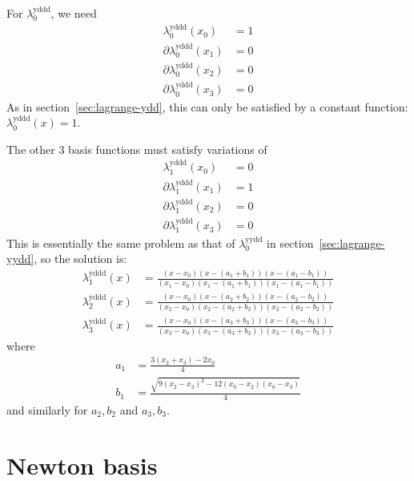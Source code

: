 For $\lambda^{\text{yddd}}_0$, we need 
\begin{align}
\lambda^{\text{yddd}}_0(x_0) & = 1 \\ 
\partial\lambda^{\text{yddd}}_0(x_1) & = 0 \nonumber \\
\partial\lambda^{\text{yddd}}_0(x_2) & = 0 \nonumber \\
\partial\lambda^{\text{yddd}}_0(x_3) & = 0 \nonumber 
\end{align}
As in section~\ref{sec:lagrange-ydd},
this can only be satisfied by a constant function:
$\lambda^{\text{yddd}}_0(x) = 1$.

The other $3$ basis functions must satisfy variations of
\begin{align}
\lambda^{\text{yddd}}_1(x_0) & = 0 \\ 
\partial\lambda^{\text{yddd}}_1(x_1) & = 1 \nonumber \\
\partial\lambda^{\text{yddd}}_1(x_2) & = 0 \nonumber \\
\partial\lambda^{\text{yddd}}_1(x_3) & = 0 \nonumber 
\end{align}
This is essentially the same problem as that of $\lambda^{\text{yydd}}_0$
in section~\ref{sec:lagrange-yydd},
so the solution is:
\begin{align}
\lambda^{\text{yddd}}_1(x) & =
\frac{(x-x_0)(x-(a_1+b_1))(x-(a_1-b_1))}
{(x_1-x_0)(x_1-(a_1+b_1))(x_1-(a_1-b_1))}
\\
\lambda^{\text{yddd}}_2(x) & =
\frac{(x-x_0)(x-(a_2+b_2))(x-(a_2-b_2))}
{(x_2-x_0)(x_2-(a_2+b_2))(x_2-(a_2-b_2))}
\nonumber \\
\lambda^{\text{yddd}}_3(x) & =
\frac{(x-x_0)(x-(a_3+b_3))(x-(a_3-b_3))}
{(x_3-x_0)(x_3-(a_3+b_3))(x_3-(a_3-b_3))}
\nonumber
\end{align}
where
\begin{align}
a_1 & = 
\frac{3 (x_2 + x_3) - 2 x_0}{4} 
\\ 
b_1 & = 
\frac{\sqrt{ 9 (x_2 - x_3)^2 - 12 (x_0 - x_2) (x_0 -x_3)}}{4} 
\nonumber
\end{align}
and similarly for $a_2,b_2$ and $a_3,b_3$.
 
\section{Newton basis}

\cite{wiki:Newton-polynomial}




